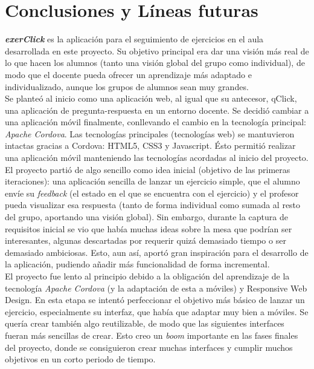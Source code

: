 
\pagestyle{fancy}

\chapter{Conclusiones y Líneas futuras}
\label{conclusiones}

\textit{\textbf{exerClick}} es la aplicación para el seguimiento de ejercicios en el aula desarrollada en este proyecto. Su objetivo principal era dar una visión más real de lo que hacen los alumnos (tanto una visión global del grupo como individual), de modo que el docente pueda ofrecer un aprendizaje más adaptado e individualizado, aunque los grupos de alumnos sean muy grandes.\\

Se planteó al inicio como una aplicación web, al igual que su antecesor, qClick, una aplicación de pregunta-respuesta en un entorno docente. Se decidió cambiar a una aplicación móvil finalmente, conllevando el cambio en la tecnología principal: \textit{Apache Cordova}. Las tecnologías principales (tecnologías web) se mantuvieron intactas gracias a Cordova: HTML5, CSS3 y Javascript. Ésto permitió realizar una aplicación móvil manteniendo las tecnologías acordadas al inicio del proyecto.\\

El proyecto partió de algo sencillo como idea inicial (objetivo de las primeras iteraciones): una aplicación sencilla de lanzar un ejercicio simple, que el alumno envíe su \textit{feedback} (el estado en el que se encuentra con el ejercicio) y el profesor pueda visualizar esa respuesta (tanto de forma individual como sumada al resto del grupo, aportando una visión global). Sin embargo, durante la captura de requisitos inicial se vio que había muchas ideas sobre la mesa que podrían ser interesantes, algunas descartadas por requerir quizá demasiado tiempo o ser demasiado ambiciosas. Esto, aun así, aportó gran inspiración para el desarrollo de la aplicación, pudiendo añadir más funcionalidad de forma incremental.\\

El proyecto fue lento al principio debido a la obligación del aprendizaje de la tecnología \textit{Apache Cordova} (y la adaptación de esta a móviles) y Responsive Web Design. En esta etapa se intentó perfeccionar el objetivo más básico de lanzar un ejercicio, especialmente su interfaz, que había que adaptar muy bien a móviles. Se quería crear también algo reutilizable, de modo que las siguientes interfaces fueran más sencillas de crear. Esto creo un \textit{boom} importante en las fases finales del proyecto, donde se consiguieron crear muchas interfaces y cumplir muchos objetivos en un corto periodo de tiempo.\\


